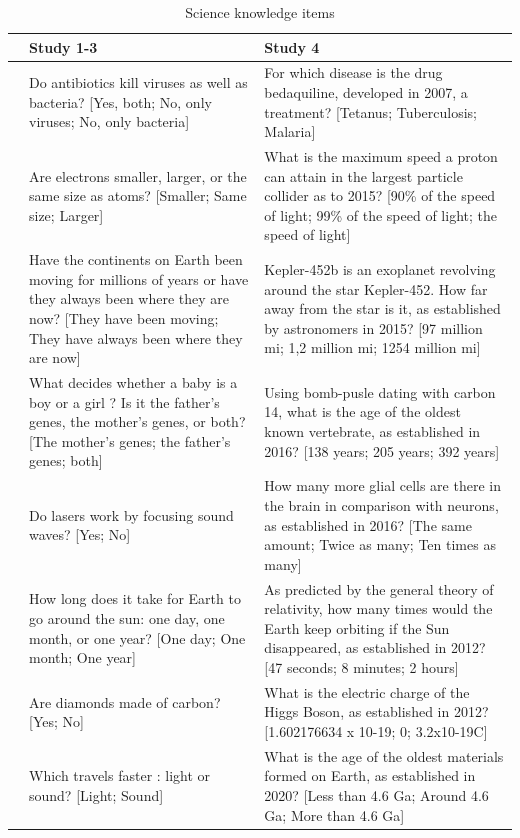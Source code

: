 \documentclass[
  doc,floatsintext]{apa6}
\begin{document}
\begin{longtable}[t]{>{\raggedleft\arraybackslash}p{2em}>{\raggedright\arraybackslash}p{22em}>{\raggedright\arraybackslash}p{22em}}
\caption{\label{tab:knowledge}Science knowledge items}\\
\toprule
 & Study 1-3 & Study 4\\
\midrule
1 & Do antibiotics kill viruses as well as bacteria? [Yes, both; No, only viruses; No, only bacteria] & For which disease is the drug bedaquiline, developed in 2007, a treatment? [Tetanus; Tuberculosis; Malaria]\\
2 & Are electrons smaller, larger, or the same size as atoms? [Smaller; Same size; Larger] & What is the maximum speed a proton can attain in the largest particle collider as to 2015? [90\% of the speed of light; 99\% of the speed of light; the speed of light]\\
3 & Have the continents on Earth been moving for millions of years or have they always been where they are now? [They have been moving; They have always been where they are now] & Kepler-452b is an exoplanet revolving around the star Kepler-452. How far away from the star is it, as established by astronomers in 2015? [97 million mi; 1,2 million mi; 1254 million mi]\\
4 & What decides whether a baby is a boy or a girl ? Is it the father's genes, the mother's genes, or both? [The mother's genes; the father's genes; both] & Using bomb-pusle dating with carbon 14, what is the age of the oldest known vertebrate, as established in 2016? [138 years; 205 years;  392 years]\\
5 & Do lasers work by focusing sound waves? [Yes; No] & How many more glial cells are there in the brain in comparison with neurons, as established in 2016? [The same amount; Twice as many; Ten times as many]\\
\addlinespace
6 & How long does it take for Earth to go around the sun: one day, one month, or one year? [One day; One month; One year] & As predicted by the general theory of relativity, how many times would the Earth keep orbiting if the Sun disappeared, as established in 2012? [47 seconds; 8 minutes;  2 hours]\\
7 & Are diamonds made of carbon? [Yes; No] & What is the electric charge of the Higgs Boson, as established in 2012? [1.602176634 x 10-19; 0; 3.2x10-19C]\\
8 & Which travels faster : light or sound? [Light; Sound] & What is the age of the oldest materials formed on Earth, as established in 2020? [Less than 4.6 Ga; Around 4.6 Ga; More than 4.6 Ga]\\

\end{longtable}
\end{document}
